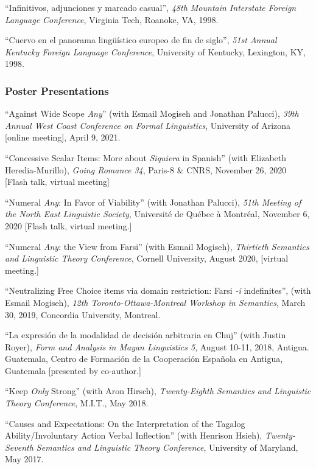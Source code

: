 \documentclass[11pt]{article}
\begin{document}
``Infinitivos, adjunciones y marcado casual'', \textit{48th Mountain Interstate Foreign Language Conference}, Virginia Tech, Roanoke, VA, 1998. 

``Cuervo en el panorama ling\"{u}\'istico europeo de fin de siglo'', \textit{51st Annual Kentucky Foreign Language Conference}, University of Kentucky, Lexington, KY, 1998. 

\subsubsection*{Poster Presentations}

``Against Wide Scope \textit{Any}'' (with Esmail Mogiseh and Jonathan Palucci), \textit{39th Annual West Coast Conference on Formal Linguistics}, University of Arizona [online meeting], April 9, 2021.

``Concessive Scalar Items: More about \textit{Siquiera} in Spanish'' (with Elizabeth Heredia-Murillo),
\textit{Going Romance 34}, Paris-8 \& CNRS, November 26, 2020 [Flash talk, virtual meeting]

``Numeral
\textit{Any}: In Favor of Viability'' (with Jonathan Palucci),  \textit{51th Meeting of the
  North East Linguistic Society}, Universit\'e de Qu\'ebec \`a
Montr\'eal, November 6, 2020 [Flash talk, virtual meeting.]

``Numeral \textit{Any}: the View from Farsi'' (with Esmail Mogiseh), \textit{Thirtieth Semantics and Linguistic Theory Conference}, Cornell University, August 2020, [virtual meeting.]

``Neutralizing Free Choice items via domain restriction: Farsi \textit{-i} indefinites'', (with Esmail Mogiseh), \textit{12th Toronto-Ottawa-Montreal Workshop in Semantics}, March 30, 2019, Concordia University, Montreal.

``La expresi\'on de la modalidad de decisi\'on arbitraria en Chuj'' (with Justin Royer), \textit{Form and Analysis in Mayan Linguistics 5}, August 10-11, 2018, Antigua. Guatemala, Centro de Formaci\'on de la Cooperaci\'on Espa\~nola en Antigua, Guatemala [presented by co-author.]

``Keep \textit{Only} Strong'' (with Aron Hirsch), \textit{Twenty-Eighth Semantics and Linguistic Theory Conference}, M.I.T., May 2018. 

``Causes and Expectations: On the Interpretation of the Tagalog Ability/Involuntary Action Verbal Inflection'' (with Henrison Hsieh), \textit{Twenty-Seventh Semantics and Linguistic Theory Conference}, University of Maryland, May 2017. 
\end{document}
